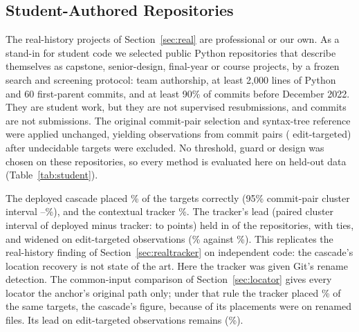 \subsection{Student-Authored Repositories}\label{sec:student}
The real-history projects of Section~\ref{sec:real} are professional or our own. As a stand-in for student code we selected \hTwoRepos{} public Python repositories that describe themselves as capstone, senior-design, final-year or course projects, by a frozen search and screening protocol: team authorship, at least 2,000 lines of Python and 60 first-parent commits, and at least 90\% of commits before December 2022. They are student work, but they are not supervised resubmissions, and commits are not submissions. The original commit-pair selection and syntax-tree reference were applied unchanged, yielding \hTwoN{} observations from \hTwoPairs{} commit pairs (\hTwoTargetedN{} edit-targeted) after \hTwoExcluded{} undecidable targets were excluded. No threshold, guard or design was chosen on these repositories, so every method is evaluated here on held-out data (Table~\ref{tab:student}).



The deployed cascade placed \hTwoDepAcc\% of the targets correctly (95\% commit-pair cluster interval \hTwoDepAccLo--\hTwoDepAccHi\%), and the contextual tracker \hTwoTrkAcc\%. The tracker's lead (paired cluster interval of deployed minus tracker: \hTwoDiffLo{} to \hTwoDiffHi{} points) held in \hTwoTrkLeadRepos{} of the \hTwoRepos{} repositories, with \hTwoTieRepos{} ties, and widened on edit-targeted observations (\hTwoDepTgtAcc\% against \hTwoTrkTgtAcc\%). This replicates the real-history finding of Section~\ref{sec:realtracker} on independent code: the cascade's location recovery is not state of the art. Here the tracker was given Git's rename detection. The common-input comparison of Section~\ref{sec:locator} gives every locator the anchor's original path only; under that rule the tracker placed \wiStuTrQAcc\% of the same targets, the cascade's figure, because \wiStuTrRenamed{} of its placements were on renamed files. Its lead on edit-targeted observations remains (\wiStuTgtTrQAcc\%).

